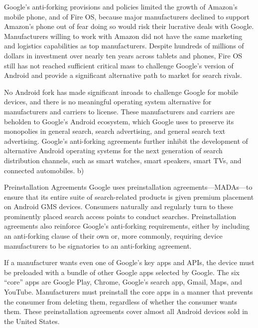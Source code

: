 \documentclass[11pt,b5paper]{scrartcl}
\begin{document}

Google’s anti-forking provisions and policies limited the growth of Amazon’s
mobile phone, and of Fire OS, because major manufacturers declined to support Amazon’s
phone out of fear doing so would risk their lucrative deals with Google. Manufacturers willing to
work with Amazon did not have the same marketing and logistics capabilities as top
manufacturers. Despite hundreds of millions of dollars in investment over nearly ten years across
tablets and phones, Fire OS still has not reached sufficient critical mass to challenge Google’s
version of Android and provide a significant alternative path to market for search rivals.


No Android fork has made significant inroads to challenge Google for mobile
devices, and there is no meaningful operating system alternative for manufacturers and carriers
to license. These manufacturers and carriers are beholden to Google’s Android ecosystem, which
Google uses to preserve its monopolies in general search, search advertising, and general search
text advertising. Google’s anti-forking agreements further inhibit the development of alternative
Android operating systems for the next generation of search distribution channels, such as smart
watches, smart speakers, smart TVs, and connected automobiles.
b)


Preinstallation Agreements
Google uses preinstallation agreements—MADAs—to ensure that its entire suite
of search-related products is given premium placement on Android GMS devices. Consumers
naturally and regularly turn to these prominently placed search access points to conduct searches.
Preinstallation agreements also reinforce Google’s anti-forking requirements, either by including
an anti-forking clause of their own or, more commonly, requiring device manufacturers to be
signatories to an anti-forking agreement.


If a manufacturer wants even one of Google’s key apps and APIs, the device must
be preloaded with a bundle of other Google apps selected by Google. The six “core” apps are
Google Play, Chrome, Google’s search app, Gmail, Maps, and YouTube. Manufacturers must
preinstall the core apps in a manner that prevents the consumer from deleting them, regardless of
whether the consumer wants them. These preinstallation agreements cover almost all Android
devices sold in the United States.
\end{document}
